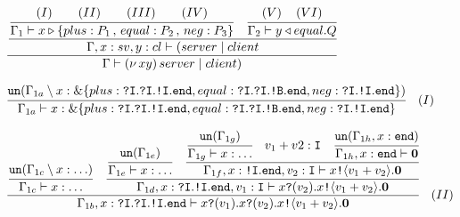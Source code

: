 \documentclass{l4proj}
\begin{document}
\begin{figure}[H]
\begin{subfigure}{\textwidth}
\[\cfrac{\cfrac{\cfrac{\hfill (I) \hfill (II) \hfill (III) \hfill (IV) \hfill}{\Gamma_{1} \vdash x \triangleright \{plus: P_{1}\,,\,equal: P_{2}\,,\,neg: P_{3} \}} \quad \cfrac{\hfill (V) \hfill (VI) \hfill}{\Gamma_{2} \vdash y \triangleleft equal.Q}}{\Gamma, x : sv, y : cl \vdash (server \mid client}}{\Gamma \vdash (\nu\,xy)\,server \mid client)}\]
\vspace{\fill}
\end{subfigure}

\begin{subfigure}{\textwidth}
\[\cfrac{\texttt{un}(\Gamma_{1a} \setminus x : \&\{plus : \texttt{?I}.\texttt{?I}.\texttt{!I}.\texttt{end}, equal : \texttt{?I}.\texttt{?I}.\texttt{!B}.\texttt{end}, neg : \texttt{?I}.\texttt{!I}.\texttt{end}\})}{\Gamma_{1a} \vdash x : \&\{plus : \texttt{?I}.\texttt{?I}.\texttt{!I}.\texttt{end}, equal : \texttt{?I}.\texttt{?I}.\texttt{!B}.\texttt{end}, neg : \texttt{?I}.\texttt{!I}.\texttt{end}\}}  \quad \displaystyle{(I)}\]
\vspace{\fill}
\end{subfigure}

\begin{subfigure}{\textwidth}
\[\cfrac{\cfrac{\texttt{un}(\Gamma_{1c} \setminus x : \ldots)}{\Gamma_{1c} \vdash x : \ldots} \quad \cfrac{\cfrac{\texttt{un}(\Gamma_{1e})}{\Gamma_{1e}  \vdash x : \ldots} \quad \cfrac{\cfrac{\texttt{un}(\Gamma_{1g})}{\Gamma_{1g} \vdash x : \ldots} \quad v_{1} + v{2} : \texttt{I} \quad \cfrac{\texttt{un}(\Gamma_{1h}, x : \texttt{end})}{\Gamma_{1h}, x : \texttt{end} \vdash \textbf{0}} }{\Gamma_{1f}, x : \texttt{!I}.\texttt{end}, v_{2} : \texttt{I} \vdash x\texttt{!} \langle v_{1} + v_{2} \rangle .\textbf{0}}}{\Gamma_{1d}, x : \texttt{?I}.\texttt{!I}.\texttt{end}, v_{1} : \texttt{I} \vdash x\texttt{?}(v_{2}).x\texttt{!} \langle v_{1} + v_{2} \rangle .\textbf{0}}}{\Gamma_{1b}, x : \texttt{?I}.\texttt{?I}.\texttt{!I}.\texttt{end} \vdash x\texttt{?}(v_{1}).x\texttt{?}(v_{2}).x\texttt{!} \langle v_{1} + v_{2} \rangle .\textbf{0}} \quad \displaystyle{(II)}\]
\vspace{\fill}
\end{subfigure}


\end{figure}
\end{document}
